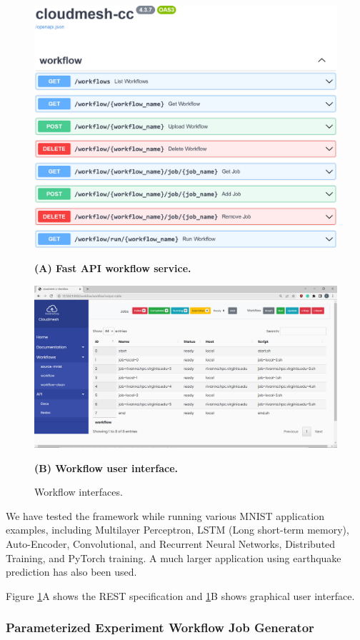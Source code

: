 \documentclass[utf8]{FrontiersinVancouver} %
\begin{document}
\begin{figure}[htb]
  \centering\includegraphics[width=0.8\columnwidth]{images/fastapi-service-highres.jpg}
  
  {\bf (A) Fast API workflow service.}

  \bigskip


    \centering\includegraphics[width=0.8\columnwidth]{images/cc-1.jpg}

    {\bf (B) Workflow user interface.}

    \caption{Workflow interfaces.}
    \label{fig:cc-3}
\end{figure}


We have tested the framework while running various MNIST application examples, including Multilayer Perceptron, LSTM (Long short-term memory), Auto-Encoder, Convolutional, and Recurrent Neural Networks, Distributed Training, and PyTorch training.  A much larger application using earthquake prediction has also been used.

Figure \ref{fig:cc-3}A shows the REST specification and \ref{fig:cc-3}B shows graphical user interface.

\subsubsection{Parameterized Experiment Workflow Job Generator}
\label{sec:workflow-sbatch}
\end{document}
